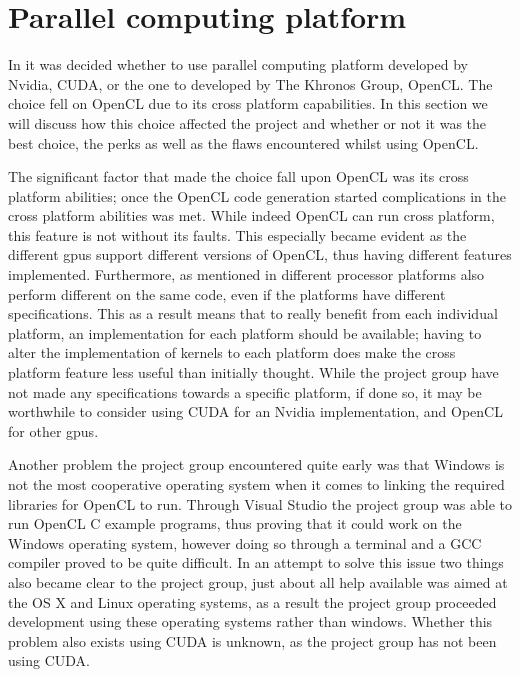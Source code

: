 \section{Parallel computing platform}
In  it was decided whether to use parallel computing platform developed by Nvidia, CUDA, or the one to developed by The Khronos Group, OpenCL.
The choice fell on OpenCL due to its cross platform capabilities.
In this section we will discuss how this choice affected the project and whether or not it was the best choice, the perks as well as the flaws encountered whilst using OpenCL.

The significant factor that made the choice fall upon OpenCL was its cross platform abilities; once the OpenCL code generation started complications in the cross platform abilities was met.
While indeed OpenCL can run cross platform, this feature is not without its faults.
This especially became evident as the different \acrshort{gpu}s support different versions of OpenCL, thus having different features implemented.
Furthermore, as mentioned in  different processor platforms also perform different on the same code, even if the platforms have different specifications.
This as a result means that to really benefit from each individual platform, an implementation for each platform should be available; having to alter the implementation of kernels to each platform does make the cross platform feature less useful than initially thought.
While the project group have not made any specifications towards a specific platform, if done so, it may be worthwhile to consider using CUDA for an Nvidia implementation, and OpenCL for other \acrshort{gpu}s.

Another problem the project group encountered quite early was that Windows is not the most cooperative operating system when it comes to linking the required libraries for OpenCL to run.
Through Visual Studio the project group was able to run OpenCL C example programs, thus proving that it could work on the Windows operating system, however doing so through a terminal and a GCC compiler proved to be quite difficult.
In an attempt to solve this issue two things also became clear to the project group, just about all help available was aimed at the OS X and Linux operating systems, as a result the project group proceeded development using these operating systems rather than windows.
Whether this problem also exists using CUDA is unknown, as the project group has not been using CUDA.
%

